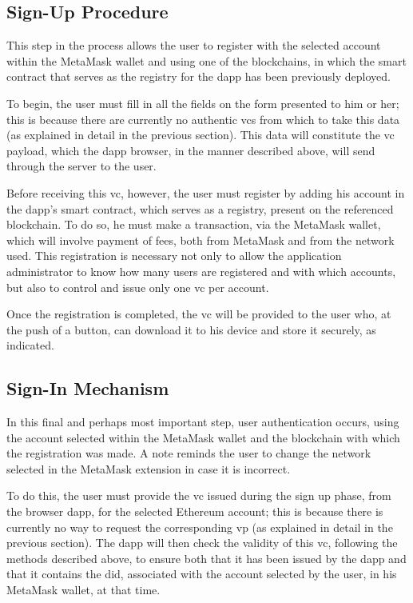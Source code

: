 \subsection{Sign-Up Procedure}

This step in the process allows the user to register with the selected account within the MetaMask wallet and using one of the blockchains, in which the smart contract that 
serves as the registry for the \gls{dapp} has been previously deployed.

To begin, the user must fill in all the fields on the form presented to him or her; this is because there are currently no authentic \gls{vc}s from which to take this data (as 
explained in detail in the previous section). This data will constitute the \gls{vc} payload, which the \gls{dapp} browser, in the manner described above, will send through the 
server to the user.

Before receiving this \gls{vc}, however, the user must register by adding his account in the \gls{dapp}'s smart contract, which serves as a registry, present on the referenced 
blockchain. To do so, he must make a transaction, via the MetaMask wallet, which will involve payment of fees, both from MetaMask and from the network used. This 
registration is necessary not only to allow the application administrator to know how many users are registered and with which accounts, but also to control and issue only 
one \gls{vc} per account.

Once the registration is completed, the \gls{vc} will be provided to the user who, at the push of a button, can download it to his device and store it securely, as indicated.

\subsection{Sign-In Mechanism}

In this final and perhaps most important step, user authentication occurs, using the account selected within the MetaMask wallet and the blockchain with which the 
registration was made. A note reminds the user to change the network selected in the MetaMask extension in case it is incorrect.

To do this, the user must provide the \gls{vc} issued during the sign up phase, from the browser \gls{dapp}, for the selected Ethereum account; this is because there is 
currently no way to request the corresponding \gls{vp} (as explained in detail in the previous section). The \gls{dapp} will then check the validity of this \gls{vc}, following the 
methods described above, to ensure both that it has been issued by the \gls{dapp} and that it contains the \gls{did}, associated with the account selected by the user, in his 
MetaMask wallet, at that time.

